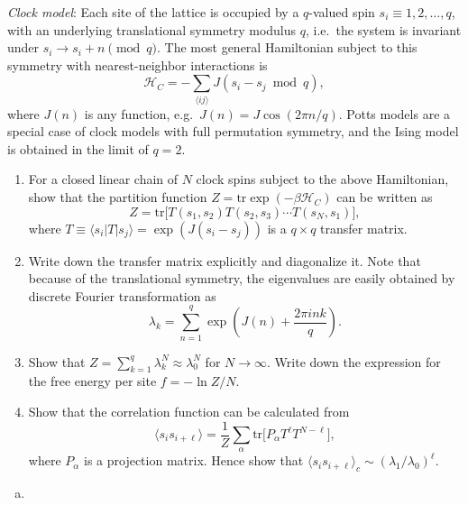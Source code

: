 \begin{problem}
    \textit{Clock model}: Each site of the lattice is occupied by a $q$-valued spin $s_i \equiv 1, 2, \ldots, q$, with an underlying translational symmetry modulus $q$, i.e.\ the system is invariant under $s_i \to s_i + n \pmod{q}$. The most general Hamiltonian subject to this symmetry with nearest-neighbor interactions is
    \[
        \mathcal{H}_C = -\sum_{\langle ij\rangle} J(s_i - s_j \bmod q),
    \]
    where $J(n)$ is any function, e.g.\ $J(n) = J\cos(2\pi n/q)$. Potts models are a special case of clock models with full permutation symmetry, and the Ising model is obtained in the limit of $q = 2$.

    \begin{enumerate}
        \item[(a)] For a closed linear chain of $N$ clock spins subject to the above Hamiltonian, show that the partition function $Z = \text{tr}\exp(-\beta\mathcal{H}_C)$ can be written as
        \[
            Z = \text{tr}\bigl[T(s_1, s_2) T(s_2, s_3)\cdots T(s_N, s_1)\bigr],
        \]
        where $T \equiv \langle s_i|T|s_j\rangle = \exp(J(s_i - s_j))$ is a $q\times q$ transfer matrix.

        \item[(b)] Write down the transfer matrix explicitly and diagonalize it. Note that because of the translational symmetry, the eigenvalues are easily obtained by discrete Fourier transformation as
        \[
            \lambda_k = \sum_{n=1}^{q}\exp\!\left(J(n) + \frac{2\pi i n k}{q}\right).
        \]

        \item[(c)] Show that $Z = \sum_{k=1}^q \lambda_k^N \approx \lambda_0^N$ for $N \to \infty$. Write down the expression for the free energy per site $f = -\ln Z/N$.

        \item[(d)] Show that the correlation function can be calculated from
        \[
            \langle s_i s_{i+\ell}\rangle = \frac{1}{Z}\sum_\alpha \text{tr}\bigl[P_\alpha T^\ell T^{N-\ell}\bigr],
        \]
        where $P_\alpha$ is a projection matrix. Hence show that $\langle s_i s_{i+\ell}\rangle_c \sim (\lambda_1/\lambda_0)^\ell$.
    \end{enumerate}
\end{problem}

\begin{solution}
    \begin{enumerate}[(a)]
        \item
    \end{enumerate}
\end{solution}


